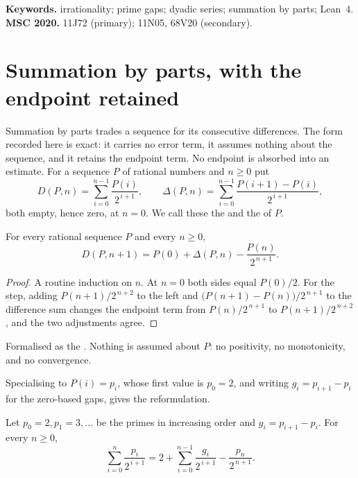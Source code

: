 \documentclass[11pt]{article}
\begin{document}
\medskip
\noindent\textbf{Keywords.} irrationality; prime gaps; dyadic series;
summation by parts; Lean~4.
\qquad
\textbf{MSC 2020.} 11J72 (primary); 11N05, 68V20 (secondary).

\section{Summation by parts, with the endpoint retained}\label{long251:sec:parts}

Summation by parts trades a sequence for its consecutive differences.  The form
recorded here is exact: it carries no error term, it assumes nothing about the
sequence, and it retains the endpoint term.  No endpoint is absorbed into an
estimate.  For a sequence $P$ of rational numbers and $n\ge0$ put
\[
 D(P,n)=\sum_{i=0}^{n-1}\frac{P(i)}{2^{\,i+1}},
 \qquad
 \Delta(P,n)=\sum_{i=0}^{n-1}\frac{P(i+1)-P(i)}{2^{\,i+1}} ,
\]
both empty, hence zero, at $n=0$.  We call these the
 and the
 of $P$.

\begin{proposition}\label{long251:res:abel}
For every rational sequence $P$ and every $n\ge0$,
\[
 D(P,n+1)=P(0)+\Delta(P,n)-\frac{P(n)}{2^{\,n+1}} .
\]
\end{proposition}

\begin{proof}
A routine induction on $n$.  At $n=0$ both sides equal $P(0)/2$.  For the step,
adding $P(n+1)/2^{\,n+2}$ to the left and $\bigl(P(n+1)-P(n)\bigr)/2^{\,n+1}$
to the difference sum changes the endpoint term from $P(n)/2^{\,n+1}$ to
$P(n+1)/2^{\,n+2}$, and the two adjustments agree.
\end{proof}

\noindent Formalised as the
.  Nothing is assumed about $P$: no positivity, no monotonicity, and
no convergence.

Specialising to $P(i)=p_i$, whose first value is $p_0=2$, and writing
$g_i=p_{i+1}-p_i$ for the zero-based gaps, gives the reformulation.

\begin{theorem}\label{long251:res:parts}
Let $p_0=2,p_1=3,\ldots$ be the primes in increasing order and
$g_i=p_{i+1}-p_i$.  For every $n\ge0$,
\[
 \sum_{i=0}^{n}\frac{p_i}{2^{\,i+1}}
 =2+\sum_{i=0}^{n-1}\frac{g_i}{2^{\,i+1}}-\frac{p_n}{2^{\,n+1}} .
\]
\end{theorem}
\end{document}

